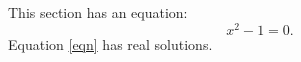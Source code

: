 This section has an equation:
\begin{equation}\label{eqn}
x^2-1=0.
\end{equation}
Equation \ref{eqn} has real solutions.
